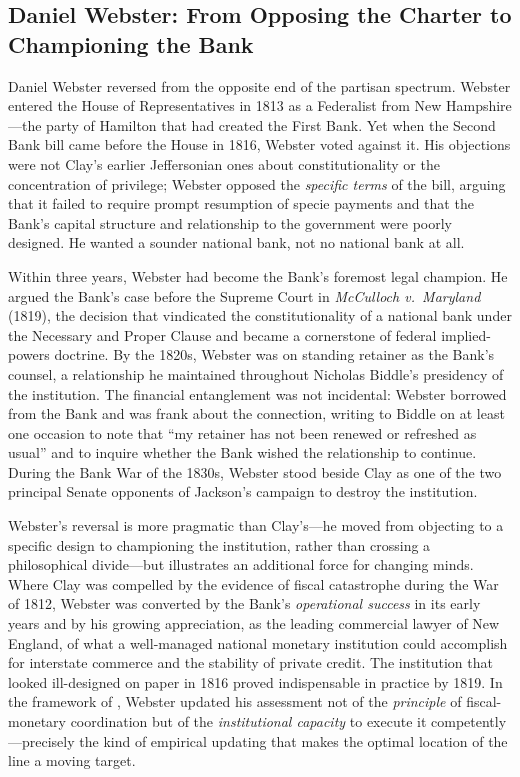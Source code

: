 \documentclass[12pt]{article}
\begin{document}
\subsection{Daniel Webster: From Opposing the Charter to Championing
             the Bank}

Daniel Webster reversed from the opposite end of the partisan spectrum.  Webster entered the House of
Representatives in 1813 as a Federalist from New Hampshire---the party
of Hamilton that had created the First Bank.  Yet when the Second Bank
bill came before the House in 1816, Webster voted against it.  His
objections were not Clay's earlier Jeffersonian ones about
constitutionality or the concentration of privilege; Webster opposed the
\emph{specific terms} of the bill, arguing that it failed to require
prompt resumption of specie payments and that the Bank's capital
structure and relationship to the government were poorly designed.  He
wanted a sounder national bank, not no national bank at all.

Within three years, Webster had become the Bank's foremost legal
champion.  He argued the Bank's case before the Supreme Court in
\textit{McCulloch v.~Maryland} (1819), the decision that vindicated
the constitutionality of a national bank under the Necessary and Proper
Clause and became a cornerstone of federal implied-powers doctrine.
By the 1820s, Webster was on standing retainer as the Bank's counsel, a
relationship he maintained throughout Nicholas Biddle's presidency of
the institution.  The financial entanglement was not incidental: Webster
borrowed from the Bank and was frank about the connection, writing to
Biddle on at least one occasion to note that ``my retainer has not been
renewed or refreshed as usual'' and to inquire whether the Bank wished
the relationship to continue.  During the Bank War of the 1830s, Webster
stood beside Clay as one of the two principal Senate opponents of
Jackson's campaign to destroy the institution.

Webster's reversal is more pragmatic than Clay's---he moved from
objecting to a specific design to championing the institution, rather
than crossing a philosophical divide---but illustrates an additional force for changing minds.
  Where Clay was compelled by the evidence of fiscal
catastrophe during the War of 1812, Webster was converted by the Bank's
\emph{operational success} in its early years and by his growing
appreciation, as the leading commercial lawyer of New England, of what
a well-managed national monetary institution could accomplish for
interstate commerce and the stability of private credit.  The
institution that looked ill-designed on paper in 1816 proved
indispensable in practice by 1819.  In the framework of
\citet{Sargent2011}, Webster updated his assessment not of the
\emph{principle} of fiscal-monetary coordination but of the
\emph{institutional capacity} to execute it competently---precisely
the kind of empirical updating that makes the optimal location of the
line a moving target.
\end{document}
